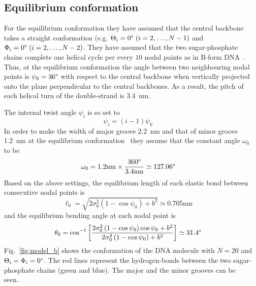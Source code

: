 \documentclass[a4paper,10pt]{article}
\begin{document}
\subsection{Equilibrium conformation}
For the equilibrium conformation they have assumed that the central backbone takes a straight conformation (e.g. $\Theta_i=0\degree\ (i=2,\dots,N-1)$ and $\Phi_i=0\degree\ (i=2,\dots,N-2)$.
They have assumed that the two sugar-phosphate chains complete one helical cycle per every $10$ nodal points as in B-form DNA~\cite{1, 2}.
Thus, at the equilibrium conformation the angle between two neighbouring nodal points is $\psi_0=36\degree$ with respect to the central backbone when vertically projected onto the plane perpendicular to the central backbones.
As a result, the pitch of each helical turn of the double-strand is \SI{3.4}{\nm}.

The internal twist angle $\psi_i$ is so set to
\begin{equation}
\psi_i=\left(i-1\right) \psi_0
\end{equation}
In order to make the width of major groove \SI{2.2}{\nm} and that of minor groove \SI{1.2}{\nm} at the equilibrium conformation~\cite{1, 2} they assume that the constant angle $\omega_0$ to be
\begin{equation}
\omega_0=1.2\text{nm}\times\dfrac{360\degree}{3.4\text{nm}}\simeq127.06\degree
\end{equation}
Based on the above settings, the equilibrium length of each elastic bond between consecutive nodal points is
\begin{equation}\label{eq:l_0}
\ell_0=\sqrt{2\sigma_0^2\left(1-\cos\psi_0\right)+b^2}\simeq0.705\text{nm}
\end{equation}
and the equilibrium bending angle at each nodal point is
\begin{equation}\label{eq:theta_0}
\theta_0=\cos^{-1}\left[\dfrac{2\sigma_0^2\left(1-\cos\psi_0\right)\cos\psi_0+b^2}{2\sigma_0^2\left(1-\cos\psi_0\right)+b^2}\right]\simeq31.4\degree
\end{equation}
Fig.~\ref{fig:model_b} shows the conformation of the DNA molecule with $N=20$ and $\Theta_{i}=\Phi_{i}=0\degree$.
The red lines represent the hydrogen-bonds between the two sugar-phosphate chains (green and blue).
The major and the minor grooves can be seen.
\end{document}
